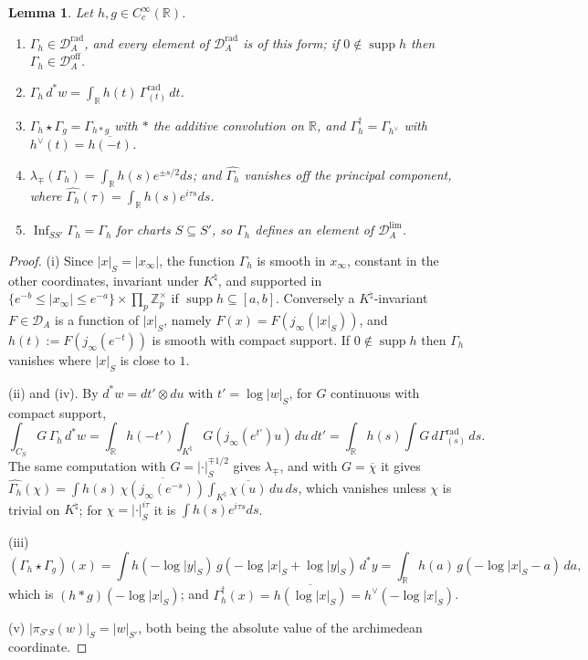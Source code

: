 \documentclass[11pt]{amsart}
\newtheorem{lemma}[theorem]{Lemma}
\theoremstyle{definition}
\newcommand{\R}{\mathbb R}
\newcommand{\Z}{\mathbb Z}
\newcommand{\supp}{\operatorname{supp}}
\newcommand{\Knat}{K^{\natural}}
\newcommand{\Drad}{\mathcal D_A^{\mathrm{rad}}}
\newcommand{\DA}{\mathcal D_A}
\newcommand{\Doff}{\mathcal D_A^{\mathrm{off}}}
\begin{document}
\begin{lemma}\label{lem:smeared}
Let $h,g\in C_c^\infty(\R)$.
\begin{enumerate}
\item[(i)] $\Gamma_h\in\Drad$, and every element of $\Drad$ is of this form;
if $0\notin\supp h$ then $\Gamma_h\in\Doff$.
\item[(ii)] $\Gamma_h\,d^*w=\int_\R h(t)\,\Gamma^{\mathrm{rad}}_{(t)}\,dt$.
\item[(iii)] $\Gamma_h\star\Gamma_g=\Gamma_{h*g}$ with $*$ the additive
convolution on $\R$, and $\Gamma_h^\dagger=\Gamma_{h^\vee}$ with
$h^\vee(t)=\overline{h(-t)}$.
\item[(iv)] $\lambda_\mp(\Gamma_h)=\int_\R h(s)e^{\pm s/2}ds$; and
$\widehat{\Gamma_h}$ vanishes off the principal component, where
$\widehat{\Gamma_h}(\tau)=\int_\R h(s)e^{i\tau s}ds$.
\item[(v)] $\operatorname{Inf}_{SS'}\Gamma_h=\Gamma_h$ for charts
$S\subseteq S'$, so $\Gamma_h$ defines an element of $\DA^{\lim}$.
\end{enumerate}
\end{lemma}

\begin{proof}
(i) Since $|x|_S=|x_\infty|$, the function $\Gamma_h$ is smooth in
$x_\infty$, constant in the other coordinates, invariant under $\Knat$, and
supported in $\{e^{-b}\le|x_\infty|\le e^{-a}\}\times\prod_p\Z_p^\times$ if
$\supp h\subseteq[a,b]$. Conversely a $\Knat$-invariant $F\in\DA$ is a
function of $|x|_S$, namely $F(x)=F(j_\infty(|x|_S))$, and
$h(t):=F(j_\infty(e^{-t}))$ is smooth with compact support. If
$0\notin\supp h$ then $\Gamma_h$ vanishes where $|x|_S$ is close to $1$.

(ii) and (iv). By $d^*w=dt'\otimes du$ with $t'=\log|w|_S$, for $G$ continuous
with compact support,
\[
  \int_{C_S}G\,\Gamma_h\,d^*w=\int_\R h(-t')\int_{\Knat}G(j_\infty(e^{t'})u)\,
  du\,dt'=\int_\R h(s)\int G\,d\Gamma^{\mathrm{rad}}_{(s)}\,ds .
\]
The same computation with $G=|\cdot|_S^{\mp1/2}$ gives $\lambda_\mp$, and with
$G=\overline\chi$ it gives $\widehat{\Gamma_h}(\chi)=\int h(s)\,
\overline{\chi(j_\infty(e^{-s}))}\int_{\Knat}\overline{\chi(u)}\,du\,ds$, which
vanishes unless $\chi$ is trivial on $\Knat$; for $\chi=|\cdot|_S^{i\tau}$ it
is $\int h(s)e^{i\tau s}ds$.

(iii)
\[
  (\Gamma_h\star\Gamma_g)(x)=\int h(-\log|y|_S)\,g(-\log|x|_S+\log|y|_S)\,d^*y
   =\int_\R h(a)\,g(-\log|x|_S-a)\,da,
\]
which is $(h*g)(-\log|x|_S)$; and
$\Gamma_h^\dagger(x)=\overline{h(\log|x|_S)}=h^\vee(-\log|x|_S)$.

(v) $|\pi_{S'S}(w)|_S=|w|_{S'}$, both being the absolute value of the
archimedean coordinate.
\end{proof}
\end{document}
